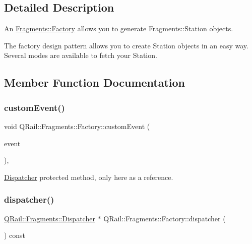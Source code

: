 \subsection{Detailed Description}
An \mbox{\hyperlink{classQRail_1_1Fragments_1_1Factory}{Fragments\+::\+Factory}} allows you to generate Fragments\+::\+Station objects. 

The factory design pattern allows you to create Station objects in an easy way. Several modes are available to fetch your Station. 

\subsection{Member Function Documentation}
\mbox{\label{classQRail_1_1Fragments_1_1Factory_a251a17b7e9ff13102ecbaa96a42a660f}} 
\subsubsection{\texorpdfstring{customEvent()}{customEvent()}}
{\footnotesize\ttfamily void Q\+Rail\+::\+Fragments\+::\+Factory\+::custom\+Event (\begin{DoxyParamCaption}\item[{Q\+Event $\ast$}]{event }\end{DoxyParamCaption})\hspace{0.3cm}{\ttfamily [protected]}, {\ttfamily [virtual]}}



\mbox{\hyperlink{classQRail_1_1Fragments_1_1Dispatcher}{Dispatcher}} protected method, only here as a reference. 

\mbox{\label{classQRail_1_1Fragments_1_1Factory_a32781d890e698f2daed981510c72287c}} 
\subsubsection{\texorpdfstring{dispatcher()}{dispatcher()}}
{\footnotesize\ttfamily \mbox{\hyperlink{classQRail_1_1Fragments_1_1Dispatcher}{Q\+Rail\+::\+Fragments\+::\+Dispatcher}} $\ast$ Q\+Rail\+::\+Fragments\+::\+Factory\+::dispatcher (\begin{DoxyParamCaption}{ }\end{DoxyParamCaption}) const}

